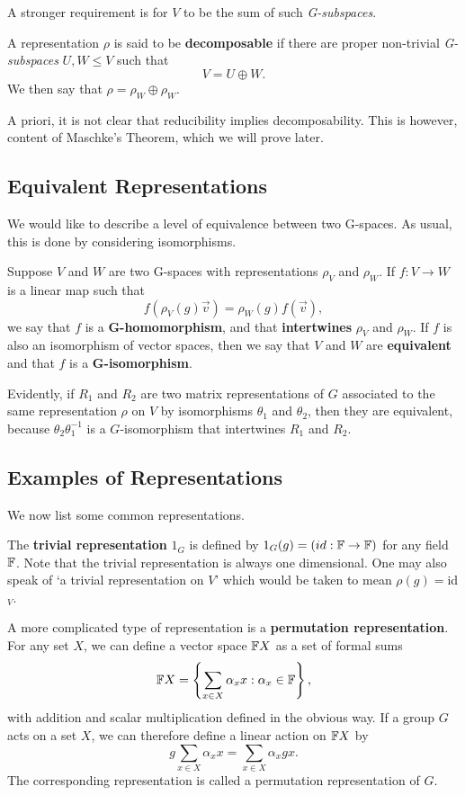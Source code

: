 \documentclass[a4paper]{article}
\begin{document}
A stronger requirement is for $V$ to be the sum of such \textit{G-subspaces}.

\begin{defi}[Decomposable]
    A representation $\rho$ is said to be \textbf{decomposable} if there are proper non-trivial \textit{G-subspaces} $U,W \leq V$ such that $$V = U \oplus W.$$ We then say that $\rho = \rho_W \oplus \rho_W$.
\end{defi}

A priori, it is not clear that reducibility implies decomposability. This is however, content of Maschke's Theorem, which we will prove later.

\subsection{Equivalent Representations}
We would like to describe a level of equivalence between two G-spaces. As usual, this is done by considering isomorphisms.

\begin{defi}[G-homomorphism]
    Suppose $V$ and $W$ are two G-spaces with representations $\rho_V$ and $\rho_W$. If $f: V \to W$ is a linear map such that $$f(\rho_V(g)\vec{v}) = \rho_W(g)f(\vec{v}),$$ we say that $f$ is a \textbf{G-homomorphism}, and that \textbf{intertwines} $\rho_V$ and $\rho_W$. If $f$ is also an isomorphism of vector spaces, then we say that $V$ and $W$ are \textbf{equivalent} and that $f$ is a \textbf{G-isomorphism}.
\end{defi}

Evidently, if $R_1$ and $R_2$ are two matrix representations of $G$ associated to the same representation $\rho$ on $V$ by isomorphisms $\theta_1$ and $\theta_2$, then they are equivalent, because $\theta_2 \theta_1^{-1}$ is a $G$-isomorphism that intertwines $R_1$ and $R_2$. 

\subsection{Examples of Representations}
We now list some common representations. 

The \textbf{trivial representation} $1_G$ is defined by $1_G(g) = (id : \mathbb{F} \to \mathbb{F})$ for any field $\mathbb{F}$. Note that the trivial representation is always one dimensional. One may also speak of `a trivial representation on $V$' which would be taken to mean $\rho(g) = $id$_V$.

A more complicated type of representation is a \textbf{permutation representation}. For any set $X$, we can define a vector space $\mathbb{F} X$ as a set of formal sums $$\mathbb{F} X = \left\{ \sum_{x \in X} \alpha_x x : \alpha_x \in \mathbb{F} \right\},$$ with addition and scalar multiplication defined in the obvious way. 
If a group $G$ acts on a set $X$, we can therefore define a linear action on $\mathbb{F} X$ by $$g\sum_{x \in X} \alpha_x x = \sum_{x \in X} \alpha_x gx.$$ The corresponding representation is called a permutation representation of $G$.
\end{document}
